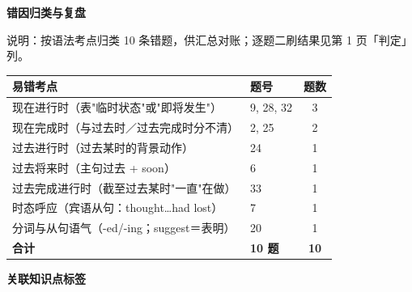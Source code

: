 \documentclass[11pt,a4paper]{article}
\begin{document}
\vspace{0.3em}

\newpage
\begin{center}
{\Large\bfseries 错因归类与复盘}
\end{center}
\vspace{-0.4em}
\noindent{\color{rulegray}\rule{\textwidth}{0.8pt}}

\vspace{0.5em}
\noindent 说明：按语法考点归类 10 条错题，供汇总对账；逐题二刷结果见第 1 页「判定」列。

\vspace{0.5em}
\renewcommand{\arraystretch}{1.35}
\begin{center}
\begin{tabular}{@{}p{6.6cm} p{7.6cm} c@{}}
\toprule
\textbf{易错考点} & \textbf{题号} & \textbf{题数} \\
\midrule
现在进行时（表"临时状态"或"即将发生"） & {\small 9, 28, 32} & 3 \\
现在完成时（与过去时／过去完成时分不清） & {\small 2, 25} & 2 \\
过去进行时（过去某时的背景动作） & {\small 24} & 1 \\
过去将来时（主句过去 + soon） & {\small 6} & 1 \\
过去完成进行时（截至过去某时"一直"在做） & {\small 33} & 1 \\
时态呼应（宾语从句：thought…had lost） & {\small 7} & 1 \\
分词与从句语气（-ed/-ing；suggest＝表明） & {\small 20} & 1 \\
\midrule
\textbf{合计} & \textbf{10 题} & \textbf{10} \\
\bottomrule
\end{tabular}
\end{center}

\vspace{0.5em}
\noindent\textbf{关联知识点标签}
\vspace{0.25em}
\end{document}
